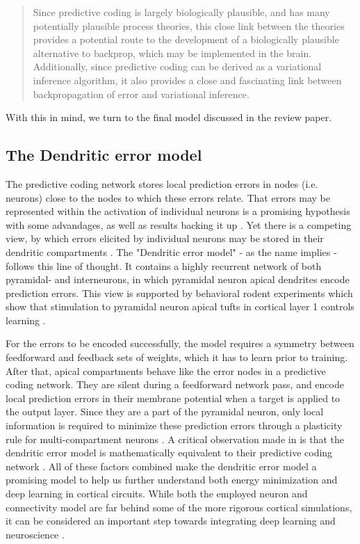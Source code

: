 \begin{quotation}
  Since predictive coding is largely biologically plausible, and has many potentially plausible process theories, this
  close link between the theories provides a potential route to the development of a biologically plausible alternative to
  backprop, which may be implemented in the brain. Additionally, since predictive coding can be derived as a variational
  inference algorithm, it also provides a close and fascinating link between backpropagation of error and variational
  inference. \citep{millidge2021predictive}
\end{quotation}

With this in mind, we turn to the final model discussed in the review paper.

\subsection{The Dendritic error model}

The predictive coding network stores local prediction errors in nodes (i.e. neurons) close to the nodes to which these
errors relate. That errors may be represented within the activation of individual neurons is a promising hypothesis with
some advandages, as well as results backing it up \citep{Hertaeg2022}. Yet there is a competing view, by which errors
elicited by individual neurons may be stored in their dendritic compartments \citep{guerguiev2017towards}. The
"Dendritic error model" \citep{sacramento2018dendritic} - as the name implies - follows this line of thought. It
contains a highly recurrent network of both pyramidal- and interneurons, in which pyramidal neuron apical dendrites
encode prediction errors. This view is supported by behavioral rodent experiments which show that stimulation to
pyramidal neuron apical tufts in cortical layer 1 controls learning \citep{Doron2020}.

For the errors to be encoded successfully, the model requires a symmetry between feedforward and feedback sets of
weights, which it has to learn prior to training. After that, apical compartments behave like the error nodes in a
predictive coding network. They are silent during a feedforward network pass, and encode local prediction errors in
their membrane potential when a target is applied to the output layer. Since they are a part of the pyramidal neuron,
only local information is required to minimize these prediction errors through a plasticity rule for multi-compartment
neurons \citep{urbanczik2014learning}. A critical observation made in
\citep{whittington2019theories} is that the dendritic error model is mathematically equivalent to their
predictive coding network . All of these factors combined
make the dendritic error model a promising model to help us further understand both energy minimization and deep
learning in cortical circuits. While both the employed neuron and connectivity model are far behind some of the more
rigorous cortical simulations, it can be considered an important step towards integrating deep learning and neuroscience
\citep{Marblestone2016}.

